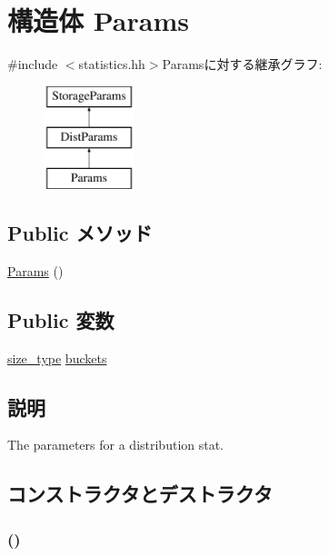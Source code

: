 \hypertarget{structStats_1_1HistStor_1_1Params}{
\section{構造体 Params}
\label{structStats_1_1HistStor_1_1Params}
}


{\ttfamily \#include $<$statistics.hh$>$}Paramsに対する継承グラフ:\begin{figure}[H]
\begin{center}
\leavevmode
\includegraphics[height=3cm]{structStats_1_1HistStor_1_1Params}
\end{center}
\end{figure}
\subsection*{Public メソッド}
\begin{DoxyCompactItemize}
\item 
\hyperlink{structStats_1_1HistStor_1_1Params_a7974597e9d3c848fd265d9445f7cf8cb}{Params} ()
\end{DoxyCompactItemize}
\subsection*{Public 変数}
\begin{DoxyCompactItemize}
\item 
\hyperlink{namespaceStats_ada51e68d31936547d3729c82daf6b7c6}{size\_\-type} \hyperlink{structStats_1_1HistStor_1_1Params_a94003530caa509b59d5355518e0ac58b}{buckets}
\end{DoxyCompactItemize}


\subsection{説明}
The parameters for a distribution stat. 

\subsection{コンストラクタとデストラクタ}
\hypertarget{structStats_1_1HistStor_1_1Params_a7974597e9d3c848fd265d9445f7cf8cb}{
\subsubsection[{Params}]{ ()}}
\label{structStats_1_1HistStor_1_1Params_a7974597e9d3c848fd265d9445f7cf8cb}




